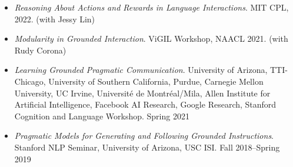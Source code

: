 \begin{itemize}[leftmargin=-0.4mm,partopsep=0pt,label=]
\item \emph{Reasoning About Actions and Rewards in Language Interactions}. MIT CPL, 2022. (with Jessy Lin)
\item \emph{Modularity in Grounded Interaction}. ViGIL Workshop, NAACL 2021. (with Rudy Corona)
\item \emph{Learning Grounded Pragmatic Communication}. University of Arizona, TTI-Chicago, University of Southern California, Purdue, Carnegie Mellon University, UC Irvine, Université de Montréal/Mila, Allen Institute for Artificial Intelligence, Facebook AI Research, Google Research, Stanford Cognition and Language Workshop. Spring 2021
\item \emph{Pragmatic Models for Generating and Following Grounded Instructions}. Stanford NLP Seminar, University of Arizona, USC ISI. Fall 2018--Spring 2019
\end{itemize}
